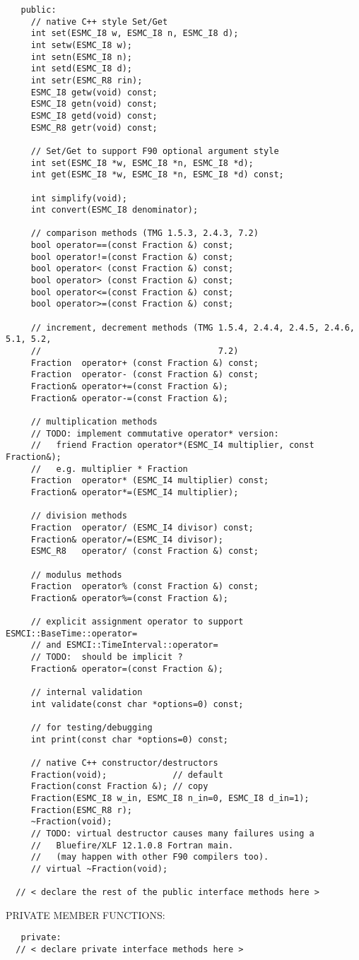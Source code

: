 \begin{verbatim} 
   public:
     // native C++ style Set/Get
     int set(ESMC_I8 w, ESMC_I8 n, ESMC_I8 d);
     int setw(ESMC_I8 w);
     int setn(ESMC_I8 n);
     int setd(ESMC_I8 d);
     int setr(ESMC_R8 rin);
     ESMC_I8 getw(void) const;
     ESMC_I8 getn(void) const;
     ESMC_I8 getd(void) const;
     ESMC_R8 getr(void) const;
 
     // Set/Get to support F90 optional argument style
     int set(ESMC_I8 *w, ESMC_I8 *n, ESMC_I8 *d);
     int get(ESMC_I8 *w, ESMC_I8 *n, ESMC_I8 *d) const;
 
     int simplify(void);
     int convert(ESMC_I8 denominator);
 
     // comparison methods (TMG 1.5.3, 2.4.3, 7.2)
     bool operator==(const Fraction &) const;
     bool operator!=(const Fraction &) const;
     bool operator< (const Fraction &) const;
     bool operator> (const Fraction &) const;
     bool operator<=(const Fraction &) const;
     bool operator>=(const Fraction &) const;
 
     // increment, decrement methods (TMG 1.5.4, 2.4.4, 2.4.5, 2.4.6, 5.1, 5.2,
     //                                   7.2)
     Fraction  operator+ (const Fraction &) const;
     Fraction  operator- (const Fraction &) const;
     Fraction& operator+=(const Fraction &);
     Fraction& operator-=(const Fraction &);
 
     // multiplication methods
     // TODO: implement commutative operator* version:
     //   friend Fraction operator*(ESMC_I4 multiplier, const Fraction&);
     //   e.g. multiplier * Fraction
     Fraction  operator* (ESMC_I4 multiplier) const;
     Fraction& operator*=(ESMC_I4 multiplier);
 
     // division methods
     Fraction  operator/ (ESMC_I4 divisor) const;
     Fraction& operator/=(ESMC_I4 divisor);
     ESMC_R8   operator/ (const Fraction &) const;
 
     // modulus methods
     Fraction  operator% (const Fraction &) const;
     Fraction& operator%=(const Fraction &); 
 
     // explicit assignment operator to support ESMCI::BaseTime::operator=
     // and ESMCI::TimeInterval::operator=
     // TODO:  should be implicit ?
     Fraction& operator=(const Fraction &);
 
     // internal validation
     int validate(const char *options=0) const;
 
     // for testing/debugging
     int print(const char *options=0) const;
 
     // native C++ constructor/destructors
     Fraction(void);             // default
     Fraction(const Fraction &); // copy
     Fraction(ESMC_I8 w_in, ESMC_I8 n_in=0, ESMC_I8 d_in=1);
     Fraction(ESMC_R8 r);
     ~Fraction(void);
     // TODO: virtual destructor causes many failures using a 
     //   Bluefire/XLF 12.1.0.8 Fortran main.
     //   (may happen with other F90 compilers too).
     // virtual ~Fraction(void);
 
  // < declare the rest of the public interface methods here >
 \end{verbatim}{\sf PRIVATE MEMBER FUNCTIONS:}
\begin{verbatim}   private:
  // < declare private interface methods here >\end{verbatim}

\setlength{\parskip}{\oldparskip}
\setlength{\parindent}{\oldparindent}
\setlength{\baselineskip}{\oldbaselineskip}
